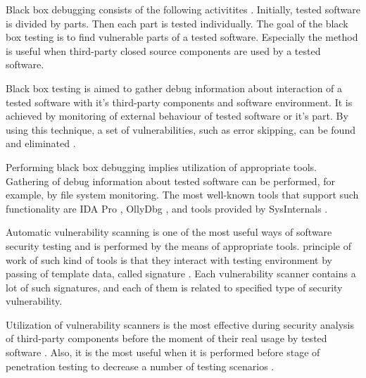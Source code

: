 
%
Black box debugging consists of the following activitites .
%
Initially, tested software is divided by parts. 
%
Then each part is tested individually. 
%
The goal of the black box testing is to find vulnerable parts of a tested software. 
%
Especially the method is useful when third-party closed source components are used by a tested software. 

%
Black box testing is aimed to gather debug information about interaction of a tested software with it's third-party components and software environment. 
%
It is achieved by monitoring of external behaviour of tested software or it's part. 
%
By using this technique, a set of vulnerabilities, such as error skipping, can be found and eliminated . 

%
Performing black box debugging implies utilization of appropriate tools. 
%
Gathering of debug information about tested software can be performed, for example, by file system monitoring. 
%
The most well-known tools that support such functionality are IDA Pro , OllyDbg , and tools provided by SysInternals . 



Automatic vulnerability scanning is one of the most useful ways of software security testing and is performed by the means of appropriate tools. 
%
\The principle of work of such kind of tools is that they interact with testing environment by passing of template data, called signature . 
%
Each vulnerability scanner contains a lot of such signatures, and each of them is related to specified type of security vulnerability. 

%
Utilization of vulnerability scanners is the most effective during security analysis of third-party components before the moment of their real usage by tested software . 
%
Also, it is the most useful when it is performed before stage of penetration testing to decrease a number of testing scenarios . 

